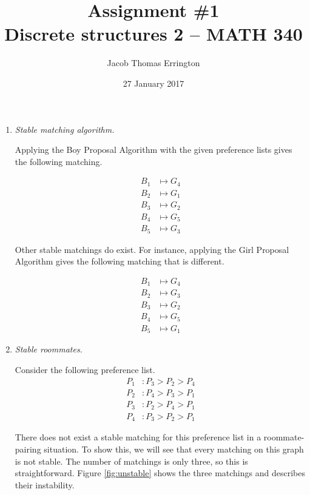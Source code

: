 \documentclass[letterpaper,11pt]{article}
\author{Jacob Thomas Errington}
\title{Assignment \#1\\Discrete structures 2 -- MATH 340}
\date{27 January 2017}
\newcommand{\questionname}{\textit}
\newcommand{\match}[2]{B_#1 &\mapsto G_#2}
\newcommand{\preference}[4]{P_#1 &: P_#2 > P_#3 > P_#4}
\begin{document}
\maketitle

\begin{enumerate}
    \item
        \questionname{Stable matching algorithm.}

        Applying the Boy Proposal Algorithm with the given preference lists
        gives the following matching.

        \begin{align*}
            \match{1}{4} \\
            \match{2}{1} \\
            \match{3}{2} \\
            \match{4}{5} \\
            \match{5}{3}
        \end{align*}

        Other stable matchings do exist. For instance, applying the Girl
        Proposal Algorithm gives the following matching that is different.

        \begin{align*}
            \match{1}{4} \\
            \match{2}{3} \\
            \match{3}{2} \\
            \match{4}{5} \\
            \match{5}{1}
        \end{align*}

    \item
        \questionname{Stable roommates.}

        Consider the following preference list.
        \begin{align*}
            \preference{1}{3}{2}{4} \\
            \preference{2}{4}{3}{1} \\
            \preference{3}{2}{4}{1} \\
            \preference{4}{3}{2}{1}
        \end{align*}

        There does not exist a stable matching for this preference list in a
        roommate-pairing situation. To show this, we will see that every
        matching on this graph is not stable. The number of matchings is only
        three, so this is straightforward. Figure \ref{fig:unstable} shows the
        three matchings and describes their instability.


\end{enumerate}
\end{document}

